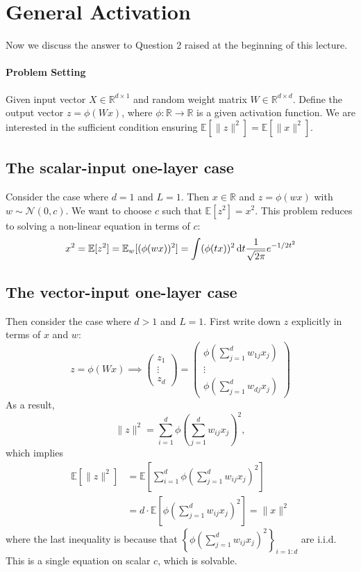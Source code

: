 \section{General Activation}
Now we discuss the answer to Question 2 raised at the beginning of this lecture.
\paragraph{Problem Setting}
Given input vector $X\in\mathbb{R}^{d\times 1}$ and random weight matrix $W\in\mathbb{R}^{d\times d}$. 
Define the output vector $z=\phi(Wx)$, where $\phi:\mathbb{R}\to\mathbb{R}$ is a given activation function. 
We are interested in the sufficient condition ensuring $\mathbb{E}[\|z\|^2]=\mathbb{E}[\|x\|^2]$.

\subsection{The scalar-input one-layer case}
Consider the case where $d=1$ and $L=1$. 
Then $x\in\mathbb{R}$ and $z=\phi(wx)$ with $w\sim\mathcal{N}(0,c)$.
We want to choose $c$ such that $\mathbb{E}[z^2]=x^2$.
This problem reduces to solving a non-linear equation in terms of $c$:
\[
x^2=\mathbb{E}[z^2]=\mathbb{E}_w[(\phi(wx))^2]=\int (\phi(tx))^2\,\mathrm{d} t\frac{1}{\sqrt{2\pi}}e^{-1/2t^2}
\]

\subsection{The vector-input one-layer case}
Then consider the case where $d>1$ and $L=1$. First write down $z$ explicitly in terms of $x$ and $w$:
\[
z = \phi(Wx)
\implies
\begin{pmatrix}
z_1\\\vdots\\ z_d
\end{pmatrix}=
\begin{pmatrix}
\phi(\sum_{j=1}^dw_{1j}x_j)\\
\vdots\\
\phi(\sum_{j=1}^dw_{dj}x_j)
\end{pmatrix}
\]
As a result,
\[
\|z\|^2 = \sum_{i=1}^d\phi\left(\sum_{j=1}^d w_{ij}x_j\right)^2,
\]
which implies
\begin{align*}
\mathbb{E}[\|z\|^2] &= \mathbb{E}\left[
\sum_{i=1}^d\phi\left(\sum_{j=1}^dw_{ij}x_j\right)^2
\right]\\
&=d\cdot\mathbb{E}\left[
\phi\left(\sum_{j=1}^dw_{ij}x_j\right)^2
\right]=\|x\|^2
\end{align*}
where the last inequality is because that $\left\{\phi\left(\sum_{j=1}^dw_{ij}x_j\right)^2\right\}_{i=1:d}$ are i.i.d.
This is a single equation on scalar $c$, which is solvable.

